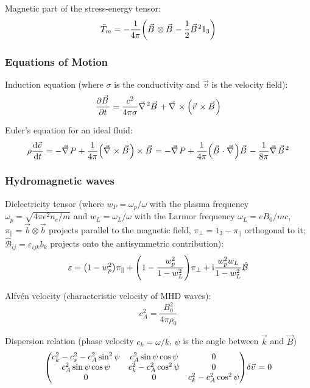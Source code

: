 			\noindent
			Magnetic part of the stress-energy tensor:
			\begin{equation}
				\bar{T}_m = -\frac{1}{4\pi} \qty(\vec{B} \otimes \vec{B} - \frac{1}{2}\vec{B}^2 1_3)
			\end{equation}

		\subsubsection{Equations of Motion}
			Induction equation (where $\sigma$ is the conductivity and $\vec{v}$ is the velocity field):
			\begin{equation}
				\pdv{\vec{B}}{t} = \frac{c^2}{4\pi\sigma} \Nabla^2 \vec{B} + \Nabla\times\qty(\vec{v}\times\vec{B})
			\end{equation}

			\noindent
			Euler's equation for an ideal fluid:
			\begin{equation}
				\rho \dv{\vec{v}}{t} = - \Nabla P + \frac{1}{4\pi}\qty(\Nabla\times\vec{B})\times\vec{B}
				= - \Nabla P + \frac{1}{4\pi} \qty(\vec{B} \cdot \Nabla) \vec{B} - \frac{1}{8\pi} \Nabla \vec{B}^2
			\end{equation}

		\subsubsection{Hydromagnetic waves}
			Dielectricity tensor (where $w_P = \omega_p / \omega$ with the plasma frequency $\omega_p = \sqrt{4\pi e^2 n_e/m}$ and $w_L = \omega_L / \omega$ with the Larmor frequency $\omega_L = e B_0/mc$, $\pi_\parallel = \vec{b}\otimes\vec{b}$ projects parallel to the magnetic field, $\pi_\perp = 1_3 - \pi_\parallel$ orthogonal to it; $\hat{\mathcal{B}}_{ij} = \varepsilon_{ijk} b_k$ projects onto the antisymmetric contribution):
			\begin{equation}
				\varepsilon = \qty(1 - w_p^2) \pi_\parallel + \qty(1-\frac{w_p^2}{1-w_L^2})\pi_\perp + \mathrm{i} \frac{w_p^2 w_L}{1-w_L^2} \hat{\mathcal{B}}
			\end{equation}

			\noindent
			Alfvén velocity (characteristic velocity of MHD waves):
			\begin{equation}
				c_A^2 = \frac{B_0^2}{4\pi \rho_0}
			\end{equation}

			\noindent
			Dispersion relation (phase velocity $c_k = \omega/k$, $\psi$ is the angle between $\vec{k}$ and $\vec{B}$)
			\begin{equation}
				\mqty(
					c_k^2 - c_s^2 - c_A^2 \sin^2 \psi & c_A^2 \sin\psi \cos\psi & 0 \\
					c_A^2 \sin\psi \cos\psi & c_k^2 - c_A^2 \cos^2 \psi & 0 \\
					0 & 0 & c_k^2 - c_A^2 \cos^2 \psi
				) \delta \vec{v} = 0
			\end{equation}


